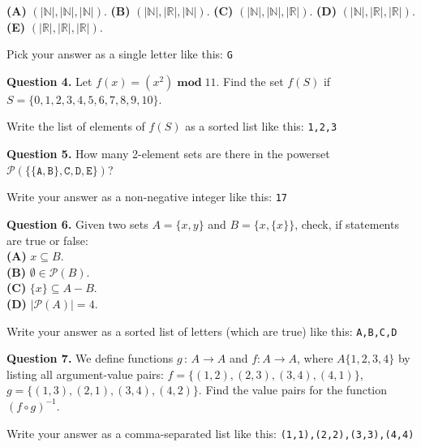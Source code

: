 \documentclass[jou]{apa6}
\begin{document}
\noindent
{\bf (A)} $\left( \left| \mathbb{N} \right|, \left| \mathbb{N} \right|, \left| \mathbb{N} \right| \right)$. 
{\bf (B)} $\left( \left| \mathbb{N} \right|, \left| \mathbb{R} \right|, \left| \mathbb{N} \right| \right)$.
{\bf (C)} $\left( \left| \mathbb{N} \right|, \left| \mathbb{N} \right|, \left| \mathbb{R} \right| \right)$.
{\bf (D)} $\left( \left| \mathbb{N} \right|, \left| \mathbb{R} \right|, \left| \mathbb{R} \right| \right)$.
{\bf (E)} $\left( \left| \mathbb{R} \right|, \left| \mathbb{R} \right|, \left| \mathbb{R} \right| \right)$.


Pick your answer as a single letter like this: {\tt G}

\vspace{6pt}
{\bf Question 4.}
Let ${\displaystyle f(x) = (x^2)\;\mathbf{mod}\;11}$. Find the set $f(S)$ if $S = \{ 0,1,2,3,4,5,6,7,8,9,10 \}$. 

Write the list of elements of $f(S)$ as a sorted list like this: {\tt 1,2,3}




\vspace{6pt}
{\bf Question 5.}
How many 2-element sets are there in the powerset $\mathcal{P}\left( \{ \{ \mathtt{A}, \mathtt{B} \}, \mathtt{C}, \mathtt{D}, \mathtt{E} \} \right)$? 

Write your answer as a non-negative integer like this: {\tt 17}


\vspace{6pt}
{\bf Question 6.}
Given two sets $A = \{ x, y \}$ and $B = \{x, \{x \}\}$, check, if statements are true or false:\\
{\bf (A)} $x \subseteq B$.\\
{\bf (B)} $\emptyset \in \mathcal{P}(B)$.\\
{\bf (C)} $\{x\} \subseteq A - B$.\\
{\bf (D)} $|\mathcal{P}(A)| = 4$.

Write your answer as a sorted list of letters (which are true) like this: {\tt A,B,C,D}

\vspace{6pt}
{\bf Question 7.}
We define functions $g\,:\, A \rightarrow A$ and $f : A \rightarrow A$, where $A \{1, 2, 3, 4\}$ by 
listing all argument-value pairs: 
$f = \{(1, 2), (2, 3), (3, 4), (4, 1)\}$, $g = \{(1, 3), (2, 1), (3, 4), (4, 2)\}$.
Find the value pairs for the function $(f \circ g)^{-1}$. 

Write your answer as a comma-separated list like this: {\tt (1,1),(2,2),(3,3),(4,4)}
\end{document}
